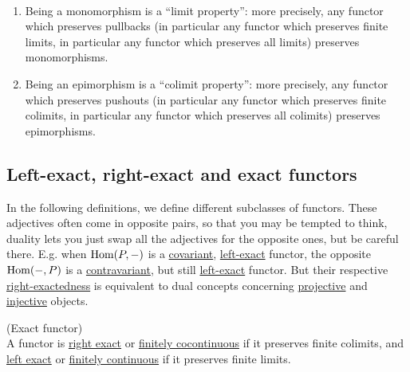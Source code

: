 \begin{corollary}\label{cor:preserve_mono_epi}\phantom{}\\
\begin{enumerate}
\renewcommand{\labelenumi}{(\theenumi)}
\item Being a monomorphism is a “limit property”: more precisely, any functor which preserves pullbacks
(in particular any functor which preserves finite limits, in particular any functor which preserves all limits)
preserves monomorphisms.
\item Being an epimorphism is a “colimit property”: more precisely, any functor which preserves pushouts
(in particular any functor which preserves finite colimits, in particular any functor which preserves all colimits)
preserves epimorphisms.
\end{enumerate}
\end{corollary}

\subsection{Left-exact, right-exact and exact functors}

In the following definitions, we define different subclasses of functors. These adjectives often come in opposite pairs, so that you may be
tempted to think, duality lets you just swap all the adjectives for the opposite ones, but be careful there. E.g. when 
$\textup{Hom}(P,-)$ is a \ul{covariant}, \ul{left-exact} functor, the opposite $\textup{Hom}(-,P)$ is a \ul{contravariant}, but still \ul{left-exact} functor.
But their respective \ul{right-exactedness} is equivalent to dual concepts concerning \ul{projective} and \ul{injective} objects.

\begin{definition}{(Exact functor)}\label{def:exact_functor}\\
A functor is \ul{right exact} or \ul{finitely cocontinuous} if it preserves finite colimits, and \ul{left exact} or \ul{finitely continuous} if it preserves finite limits.
\end{definition}

